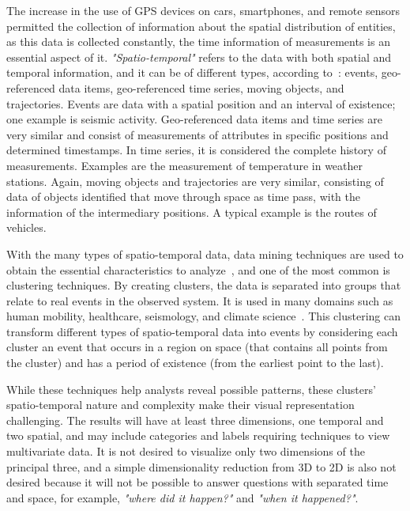 The increase in the use of GPS devices on cars, smartphones, and remote sensors permitted the collection of information about the spatial distribution of entities,
%
as this data is collected constantly, the time information of measurements is an essential aspect of it.
%
\textit{"Spatio-temporal"} refers to the data with both spatial and temporal information, and it can be of different types, according to~\cite{ansari2020spatiotemporal}: events, geo-referenced data items, geo-referenced time series, moving objects, and trajectories.
%
Events are data with a spatial position and an interval of existence; one example is seismic activity. 
%
Geo-referenced data items and time series are very similar and consist of measurements of attributes in specific positions and determined timestamps. 
%
In time series, it is considered the complete history of measurements. Examples are the measurement of temperature in weather stations.
%
Again, moving objects and trajectories are very similar, consisting of data of objects identified that move through space as time pass, with the information of the intermediary positions.
%
A typical example is the routes of vehicles.

%
With the many types of spatio-temporal data, data mining techniques are used to obtain the essential characteristics to analyze~\cite{ansari2020spatiotemporal}, and one of the most common is clustering techniques.
%
By creating clusters, the data is separated into groups that relate to real events in the observed system. It is used in many domains such as human mobility, healthcare, seismology, and climate science~\cite{BELHADI2020103857}.
%
This clustering can transform different types of spatio-temporal data into events by considering each cluster an event that occurs in a region on space (that contains all points from the cluster) and has a period of existence (from the earliest point to the last).
%

While these techniques help analysts reveal possible patterns, these clusters' spatio-temporal nature and complexity make their visual representation challenging. 
%
The results will have at least three dimensions, one temporal and two spatial, and may include categories and labels requiring techniques to view multivariate data. 
%
It is not desired to visualize only two dimensions of the principal three, and a simple dimensionality reduction from 3D to 2D is also not desired because it will not be possible to answer questions with separated time and space, for example, \textit{"where did it happen?"} and \textit{"when it happened?"}.


